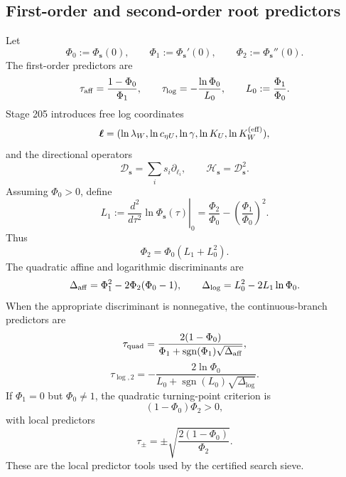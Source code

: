 \subsection{First-order and second-order root predictors}
\label{subsec:part06-root-predictors}

Let
\begin{equation}
\label{eq:part06-Phi012}
\Phi_0:=\Phi_{\mathbf s}(0),
\qquad
\Phi_1:=\Phi_{\mathbf s}'(0),
\qquad
\Phi_2:=\Phi_{\mathbf s}''(0).
\end{equation}
The first-order predictors are
\begin{equation}
\label{eq:part06-aff-log-predictors}
\tau_{\rm aff}=\frac{1-\Phi_0}{\Phi_1},
\qquad
\tau_{\log}=-\frac{\ln\Phi_0}{L_0},
\qquad
L_0:=\frac{\Phi_1}{\Phi_0}.
\end{equation}
Stage 205 introduces free log coordinates
\begin{equation}
\label{eq:part06-free-log-coords}
\boldsymbol\ell=(\ln\lambda_W,\ln c_{\eta U},\ln\gamma,\ln K_U,\ln K_W^{(\rm eff)}),
\end{equation}
and the directional operators
\begin{equation}
\label{eq:part06-directional-operators}
\mathcal D_{\mathbf s}=\sum_i s_i\partial_{\ell_i},
\qquad
\mathcal H_{\mathbf s}=\mathcal D_{\mathbf s}^2.
\end{equation}
Assuming \(\Phi_0>0\), define
\begin{equation}
\label{eq:part06-log-curvature}
L_1:=\left.\frac{d^2}{d\tau^2}\ln\Phi_{\mathbf s}(\tau)\right|_{0}
=\frac{\Phi_2}{\Phi_0}-\left(\frac{\Phi_1}{\Phi_0}\right)^2.
\end{equation}
Thus
\begin{equation}
\label{eq:part06-Phi-log-identity}
\Phi_2=\Phi_0(L_1+L_0^2).
\end{equation}
The quadratic affine and logarithmic discriminants are
\begin{equation}
\label{eq:part06-quadratic-discriminants}
\Delta_{\rm aff}=\Phi_1^2-2\Phi_2(\Phi_0-1),
\qquad
\Delta_{\log}=L_0^2-2L_1\ln\Phi_0.
\end{equation}
When the appropriate discriminant is nonnegative, the continuous-branch predictors are
\begin{equation}
\label{eq:part06-quadratic-affine-predictor}
\tau_{\rm quad}=
\frac{2(1-\Phi_0)}{\Phi_1+\operatorname{sgn}(\Phi_1)\sqrt{\Delta_{\rm aff}}},
\end{equation}
\begin{equation}
\label{eq:part06-quadratic-log-predictor}
\tau_{\log,2}=
-\frac{2\ln\Phi_0}{L_0+\operatorname{sgn}(L_0)\sqrt{\Delta_{\log}}}.
\end{equation}
If \(\Phi_1=0\) but \(\Phi_0\neq1\), the quadratic turning-point criterion is
\begin{equation}
\label{eq:part06-turning-criterion}
(1-\Phi_0)\Phi_2>0,
\end{equation}
with local predictors
\begin{equation}
\label{eq:part06-turning-predictors}
\tau_\pm=\pm\sqrt{\frac{2(1-\Phi_0)}{\Phi_2}}.
\end{equation}
These are the local predictor tools used by the certified search sieve.

